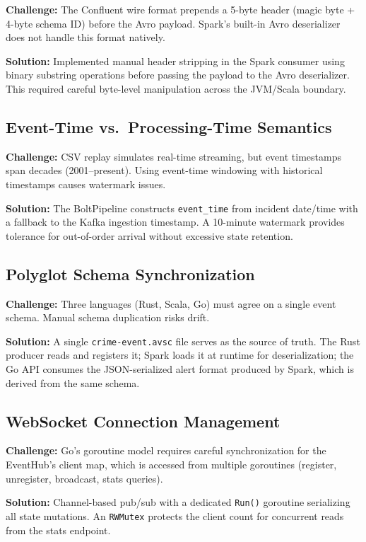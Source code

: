 \documentclass[12pt,a4paper]{article}
\begin{document}
\textbf{Challenge:} The Confluent wire format prepends a 5-byte header (magic byte + 4-byte schema ID) before the Avro payload. Spark's built-in Avro deserializer does not handle this format natively.

\textbf{Solution:} Implemented manual header stripping in the Spark consumer using binary substring operations before passing the payload to the Avro deserializer. This required careful byte-level manipulation across the JVM/Scala boundary.

\subsection{Event-Time vs.\ Processing-Time Semantics}

\textbf{Challenge:} CSV replay simulates real-time streaming, but event timestamps span decades (2001--present). Using event-time windowing with historical timestamps causes watermark issues.

\textbf{Solution:} The BoltPipeline constructs \texttt{event\_time} from incident date/time with a fallback to the Kafka ingestion timestamp. A 10-minute watermark provides tolerance for out-of-order arrival without excessive state retention.

\subsection{Polyglot Schema Synchronization}

\textbf{Challenge:} Three languages (Rust, Scala, Go) must agree on a single event schema. Manual schema duplication risks drift.

\textbf{Solution:} A single \texttt{crime-event.avsc} file serves as the source of truth. The Rust producer reads and registers it; Spark loads it at runtime for deserialization; the Go API consumes the JSON-serialized alert format produced by Spark, which is derived from the same schema.

\subsection{WebSocket Connection Management}

\textbf{Challenge:} Go's goroutine model requires careful synchronization for the EventHub's client map, which is accessed from multiple goroutines (register, unregister, broadcast, stats queries).

\textbf{Solution:} Channel-based pub/sub with a dedicated \texttt{Run()} goroutine serializing all state mutations. An \texttt{RWMutex} protects the client count for concurrent reads from the stats endpoint.
\end{document}
